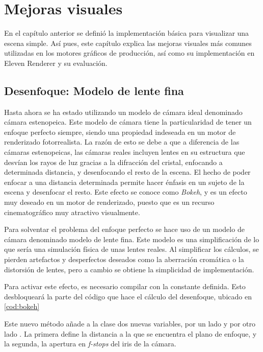 \chapter{Mejoras visuales}
\label{chap:3}
	
En el capítulo anterior se definió la implementación básica para visualizar una escena simple. Así pues, este capítulo explica las mejoras visuales más comunes utilizadas en los motores gráficos de producción, así como su implementación en Eleven Renderer y su evaluación.
	
\section{Desenfoque: Modelo de lente fina}
	
Hasta ahora se ha estado utilizando un modelo de cámara ideal denominado cámara estenopeica. Este modelo de cámara tiene la particularidad de tener un enfoque perfecto siempre, siendo una propiedad indeseada en un motor de renderizado fotorrealista. La razón de esto se debe a que a diferencia de las cámaras estenopeicas, las cámaras reales incluyen lentes en su estructura que desvían los rayos de luz gracias a la difracción del cristal, enfocando a determinada distancia, y desenfocando el resto de la escena. El hecho de poder enfocar a una distancia determinada permite hacer énfasis en un sujeto de la escena y desenfocar el resto. Este efecto se conoce como \emph{Bokeh}, y es un efecto muy deseado en un motor de renderizado, puesto que es un recurso cinematográfico muy atractivo visualmente.

Para solventar el problema del enfoque perfecto se hace uso de un modelo de cámara denominado modelo de lente fina. Este modelo es una simplificación de lo que sería una simulación física de unas lentes reales. Al simplificar los cálculos, se pierden artefactos y desperfectos deseados como la aberración cromática o la distorsión de lentes, pero a cambio se obtiene la simplicidad de implementación.

Para activar este efecto, es necesario compilar con la constante  definida. Esto desbloqueará la parte del código que hace el cálculo del desenfoque, ubicado en \autoref{cod:bokeh} 
	
Este nuevo método añade a la clase  dos nuevas variables, por un lado  y por otro lado . La primera define la distancia a la que se encuentra el plano de enfoque, y la segunda, la apertura en \emph{f-stops} del iris de la cámara. 

